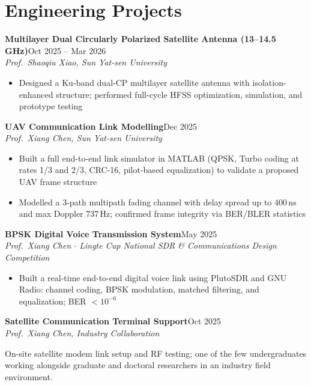 \documentclass[letterpaper,10pt]{article}
\newcommand{\entry}[4]{%
  \textbf{#1}\hfill #2\\
  #3\hfill #4\par}
\newcommand{\gap}{\vspace{2pt}}
\begin{document}
\section{Engineering Projects}
\entry{Multilayer Dual Circularly Polarized Satellite Antenna (13--14.5\,GHz)}{Oct 2025 -- Mar 2026}
  {\textit{Prof.\ Shaoqiu Xiao, Sun Yat-sen University}}{}
\begin{itemize}
  \item Designed a Ku-band dual-CP multilayer satellite antenna with isolation-enhanced structure; performed full-cycle HFSS optimization, simulation, and prototype testing
\end{itemize}
\gap
\entry{UAV Communication Link Modelling}{Dec 2025}
  {\textit{Prof.\ Xiang Chen, Sun Yat-sen University}}{}
\begin{itemize}
  \item Built a full end-to-end link simulator in MATLAB (QPSK, Turbo coding at rates 1/3 and 2/3, CRC-16, pilot-based equalization) to validate a proposed UAV frame structure
  \item Modelled a 3-path multipath fading channel with delay spread up to 400\,ns and max Doppler 737\,Hz; confirmed frame integrity via BER/BLER statistics
\end{itemize}
\gap
\entry{BPSK Digital Voice Transmission System}{May 2025}
  {\textit{Prof.\ Xiang Chen $\cdot$ Lingte Cup National SDR \& Communications Design Competition}}{}
\begin{itemize}
  \item Built a real-time end-to-end digital voice link using PlutoSDR and GNU Radio: channel coding, BPSK modulation, matched filtering, and equalization; BER $< 10^{-6}$
\end{itemize}
\gap
\entry{Satellite Communication Terminal Support}{Oct 2025}
  {\textit{Prof.\ Xiang Chen, Industry Collaboration}}{}
On-site satellite modem link setup and RF testing; one of the few undergraduates working alongside graduate and doctoral researchers in an industry field environment.\par
\end{document}
